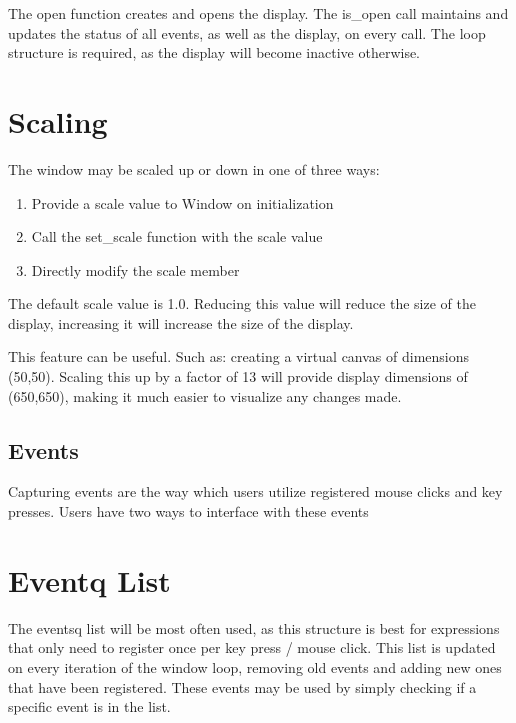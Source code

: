 \documentclass[letterpaper,10pt,english]{sphinxmanual}
\begin{document}
\begin{sphinxVerbatim}[commandchars=\\\{\}]
 
\end{sphinxVerbatim}

\sphinxAtStartPar
The open function creates and opens the display. The is\_open call maintains and updates the status of all events, as well as the display, on every call. The loop structure is required, as the display will become inactive otherwise.


\section{Scaling}
\label{\detokenize{fundamentals:scaling}}
\sphinxAtStartPar
The window may be scaled up or down in one of three ways:
\begin{enumerate}
%
\item {} 
\sphinxAtStartPar
Provide a scale value to Window on initialization

\item {} 
\sphinxAtStartPar
Call the set\_scale function with the scale value

\item {} 
\sphinxAtStartPar
Directly modify the scale member

\end{enumerate}

\sphinxAtStartPar
The default scale value is 1.0. Reducing this value will reduce the size of the display, increasing it will increase the size of the display.

\sphinxAtStartPar
This feature can be useful. Such as:
creating a virtual canvas of dimensions (50,50). Scaling this up by a factor of 13 will provide display dimensions of (650,650), making it much easier to visualize any changes made.


\subsection{Events}
\label{\detokenize{fundamentals:events}}
\sphinxAtStartPar
Capturing events are the way which users utilize registered mouse clicks and key presses. Users have two ways to interface with these events


\section{Eventq List}
\label{\detokenize{fundamentals:eventq-list}}
\sphinxAtStartPar
The eventsq list will be most often used, as this structure is best for expressions that only need to register once per key press / mouse click. This list is updated on every iteration of the window loop, removing old events and adding new ones that have been registered. These events may be used by simply checking if a specific event is in the list.
\end{document}
